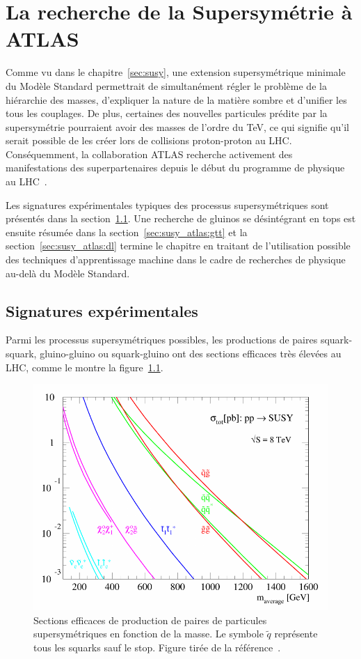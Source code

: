 \singlespacing{}
\chapter{La recherche de la Supersymétrie à ATLAS}
\label{sec:susy_atlas}
\doublespacing{}

Comme vu dans le chapitre~\ref{sec:susy}, une extension
supersymétrique minimale du Modèle Standard permettrait de
simultanément régler le problème de la hiérarchie des masses,
d'expliquer la nature de la matière sombre et d'unifier les tous les
couplages. De plus, certaines des nouvelles particules prédite par la
supersymétrie pourraient avoir des masses de l'ordre du TeV, ce qui
signifie qu'il serait possible de les créer lors de collisions
proton-proton au LHC. Conséquemment, la collaboration ATLAS recherche
activement des manifestations des superpartenaires depuis le début du
programme de physique au LHC~\cite{aad_summary_2015}. 

Les signatures expérimentales typiques des processus supersymétriques
sont présentés dans la section~\ref{sec:susy_atlas:signatures}. Une
recherche de gluinos se désintégrant en tops est ensuite résumée dans
la section~\ref{sec:susy_atlas:gtt} et la
section~\ref{sec:susy_atlas:dl} termine le chapitre en traitant de
l'utilisation possible des techniques d'apprentissage machine dans le
cadre de recherches de physique au-delà du Modèle Standard.

\section{Signatures expérimentales}
\label{sec:susy_atlas:signatures}

Parmi les processus supersymétriques possibles, les productions de
paires squark-squark, gluino-gluino ou squark-gluino ont des sections
efficaces très élevées au LHC, comme le montre la
figure~\ref{fig:susy_xsec}.

\begin{figure}
  \centering
  \includegraphics[width=.5\textwidth]{susy_xsec.pdf}
  \caption{Sections efficaces de production de paires de particules
    supersymétriques en fonction de la masse. Le symbole $\tilde{q}$
    représente tous les squarks sauf le stop. Figure tirée de la
    référence~\cite{olive_susy2_2014}.}
  \label{fig:susy_xsec}
\end{figure}


